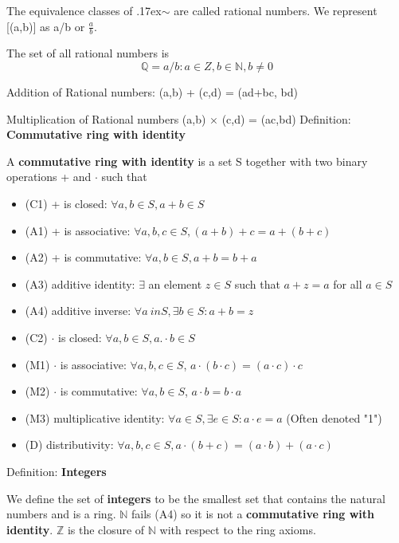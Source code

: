 \documentclass{article}
\newcommand*{\N}{\mathbb{N}}
\newcommand*{\Z}{\mathbb{Z}}
\newcommand*{\Q}{\mathbb{Q}}
\begin{document}
The equivalence classes of {\raise.17ex\hbox{$\scriptstyle\mathtt{\sim}$}}
 are called rational numbers. We represent [(a,b)] as a/b or \(\frac{a}{b}\).

The set of all rational numbers is 
\begin{equation}
    \Q = {a/b: a \in Z, b \in \N, b \neq 0}
\end{equation}

Addition of Rational numbers:
(a,b) + (c,d) = (ad+bc, bd)

Multiplication of Rational numbers
(a,b) \(\times\) (c,d) = (ac,bd)
\newpage
Definition: \textbf{Commutative ring with identity}

A \textbf{commutative ring with identity} is a set S together with two binary operations  + and \(\cdot\) such that 
\begin{itemize}
    \item (C1) + is closed: \(\forall a,b \in S, a+b \in S\)
    \item (A1) + is associative: \(\forall a,b,c \in S, (a+b)+c = a+(b+c)\)
    \item (A2) + is commutative: \(\forall a,b \in S, a+b=b+a\)
    \item (A3) additive identity: \(\exists\) an element \(z \in S\) such that \(a+z=a\) for all \(a\in S\)
    \item (A4) additive inverse: \(\forall a \ in S, \exists b\in S: a+b = z\)
    \item (C2) \(\cdot\) is closed: \(\forall a,b \in S, a.\cdot b \in S\)
    \item (M1) \(\cdot\) is associative: \(\forall a,b,c \in S\), \(a \cdot (b \cdot c) = (a \cdot c) \cdot c\)
    \item (M2) \(\cdot\) is commutative: \(\forall a,b \in S\), \(a \cdot b = b \cdot a\)
    \item (M3) multiplicative identity: \(\forall a \in S, \exists e \in S: a \cdot e = a\) (Often denoted "1")
    \item (D) distributivity: \(\forall a,b,c \in S, a \cdot (b + c) = (a \cdot b) + (a \cdot c)\)
\end{itemize}

Definition: \textbf{Integers}

We define the set of \textbf{integers} to be the smallest set that contains the natural numbers and is a ring. \(\N\) fails (A4) so it is not a \textbf{commutative ring with identity}. \(\Z\) is the closure of \(\N\) with respect to the ring axioms.
\end{document}
